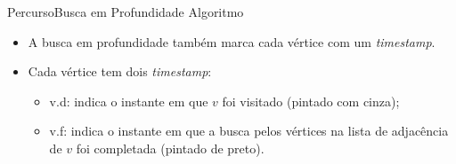 \documentclass[aspectratio=169]{beamer}
\begin{document}
\begin{frame}{Percurso}{Busca em Profundidade}
Algoritmo
\begin{itemize}
\item A busca em profundidade também marca cada vértice com um {\it timestamp}.
\item Cada vértice tem dois {\it timestamp}:
\begin{itemize}
\item v.d: indica o instante em que $v$ foi visitado (pintado com cinza);
\item v.f: indica o instante em que a busca pelos vértices na lista de adjacência de $v$ foi completada (pintado de preto).
\end{itemize}
\end{itemize}
\end{frame}

\end{document}
